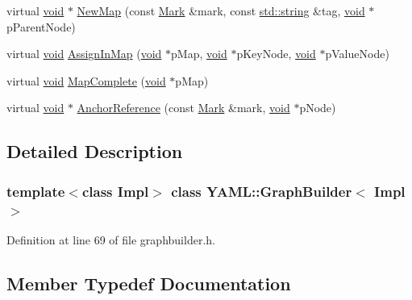 \begin{DoxyCompactItemize}
\item 
virtual \mbox{\hyperlink{glad_8h_a950fc91edb4504f62f1c577bf4727c29}{void}} $\ast$ \mbox{\hyperlink{class_y_a_m_l_1_1_graph_builder_a068a87f424528fb7ff77f998d073a92c}{New\+Map}} (const \mbox{\hyperlink{struct_y_a_m_l_1_1_mark}{Mark}} \&mark, const \mbox{\hyperlink{glad_8h_ac83513893df92266f79a515488701770}{std\+::string}} \&tag, \mbox{\hyperlink{glad_8h_a950fc91edb4504f62f1c577bf4727c29}{void}} $\ast$p\+Parent\+Node)
\item 
virtual \mbox{\hyperlink{glad_8h_a950fc91edb4504f62f1c577bf4727c29}{void}} \mbox{\hyperlink{class_y_a_m_l_1_1_graph_builder_a5f92ce9e395edd4a3ab8e3e6d772b570}{Assign\+In\+Map}} (\mbox{\hyperlink{glad_8h_a950fc91edb4504f62f1c577bf4727c29}{void}} $\ast$p\+Map, \mbox{\hyperlink{glad_8h_a950fc91edb4504f62f1c577bf4727c29}{void}} $\ast$p\+Key\+Node, \mbox{\hyperlink{glad_8h_a950fc91edb4504f62f1c577bf4727c29}{void}} $\ast$p\+Value\+Node)
\item 
virtual \mbox{\hyperlink{glad_8h_a950fc91edb4504f62f1c577bf4727c29}{void}} \mbox{\hyperlink{class_y_a_m_l_1_1_graph_builder_a351b27b50b691777d61412969b483a2d}{Map\+Complete}} (\mbox{\hyperlink{glad_8h_a950fc91edb4504f62f1c577bf4727c29}{void}} $\ast$p\+Map)
\item 
virtual \mbox{\hyperlink{glad_8h_a950fc91edb4504f62f1c577bf4727c29}{void}} $\ast$ \mbox{\hyperlink{class_y_a_m_l_1_1_graph_builder_a64e7ef2c78f86a1eb93d5d6fd5e560ea}{Anchor\+Reference}} (const \mbox{\hyperlink{struct_y_a_m_l_1_1_mark}{Mark}} \&mark, \mbox{\hyperlink{glad_8h_a950fc91edb4504f62f1c577bf4727c29}{void}} $\ast$p\+Node)
\end{DoxyCompactItemize}


\subsection{Detailed Description}
\subsubsection*{template$<$class Impl$>$\newline
class Y\+A\+M\+L\+::\+Graph\+Builder$<$ Impl $>$}



Definition at line 69 of file graphbuilder.\+h.



\subsection{Member Typedef Documentation}
\mbox{\label{class_y_a_m_l_1_1_graph_builder_af58f15b2d877d52cc93fd1d28a754207}} 
